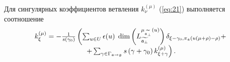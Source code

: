\begin{theorem}
  Для сингулярных коэффициентов ветвления $k^{(\mu)}_{\nu}$ (\ref{eq:21}) выполняется соотношение
  \begin{equation}
    \label{recurrent-relation}
    \begin{array}{c}
      k_{\xi }^{\left( \mu \right) }=-\frac{1}{s\left( \gamma _{0}\right) }\left(
        \sum_{u\in U} \epsilon(u)\;
        \dim \left( L_{\widetilde{\mathfrak{a}_{\perp }}}^{\mu
        _{\widetilde{\mathfrak{a}_{\perp }}}\left( u\right) }\right)
        \delta_{\xi-\gamma_0,\pi_{\mathfrak{a}}(u(\mu+\rho)-\rho)}+ \right.\\
      \left.
        +\sum_{\gamma \in
          \Gamma _{\mathfrak{a} \rightarrow \mathfrak{g}}}s\left( \gamma +\gamma _{0}\right) k_{\xi
          +\gamma }^{\left( \mu \right) }\right).
    \end{array}
  \end{equation}
\end{theorem}
